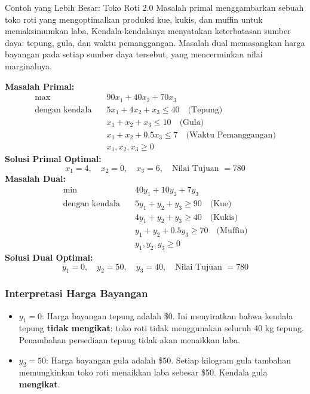 \begin{example}{Contoh yang Lebih Besar: Toko Roti 2.0}{}
Masalah primal menggambarkan sebuah toko roti yang mengoptimalkan produksi kue, kukis, dan muffin untuk memaksimumkan laba. Kendala-kendalanya menyatakan keterbatasan sumber daya: tepung, gula, dan waktu pemanggangan. Masalah dual memasangkan harga bayangan pada setiap sumber daya tersebut, yang mencerminkan nilai marginalnya.

\vspace{1em}
\noindent\textbf{Masalah Primal:}
$$
\begin{aligned}
\max\quad & 90x_1 + 40x_2 + 70x_3 \\
\text{dengan kendala} \quad
& 5x_1 + 4x_2 + x_3 \leq 40 \quad \text{(Tepung)} \\
& x_1 + x_2 + x_3 \leq 10 \quad \text{(Gula)} \\
& x_1 + x_2 + 0.5x_3 \leq 7 \quad \text{(Waktu Pemanggangan)} \\
& x_1, x_2, x_3 \geq 0
\end{aligned}
$$
\textbf{Solusi Primal Optimal:}
$$
x_1 = 4,\quad x_2 = 0,\quad x_3 = 6,\quad \text{Nilai Tujuan } = 780
$$
\vspace{1em}
\noindent\textbf{Masalah Dual:}
$$
\begin{aligned}
\min\quad & 40y_1 + 10y_2 + 7y_3 \\
\text{dengan kendala} \quad
& 5y_1 + y_2 + y_3 \geq 90 \quad \text{(Kue)} \\
& 4y_1 + y_2 + y_3 \geq 40 \quad \text{(Kukis)} \\
& y_1 + y_2 + 0.5y_3 \geq 70 \quad \text{(Muffin)} \\
& y_1, y_2, y_3 \geq 0
\end{aligned}
$$
\textbf{Solusi Dual Optimal:}
$$
y_1 = 0,\quad y_2 = 50,\quad y_3 = 40,\quad \text{Nilai Tujuan } = 780
$$

\vspace{1em}
\subsubsection*{Interpretasi Harga Bayangan}
\begin{itemize}
\item $y_1 = 0$: Harga bayangan tepung adalah \$0.
Ini menyiratkan bahwa kendala tepung \textbf{tidak mengikat}: toko roti tidak menggunakan seluruh 40 kg tepung. Penambahan persediaan tepung tidak akan menaikkan laba.

\item $y_2 = 50$: Harga bayangan gula adalah \$50.
Setiap kilogram gula tambahan memungkinkan toko roti menaikkan laba sebesar \$50. Kendala gula \textbf{mengikat}.


\end{itemize}
\end{example}
